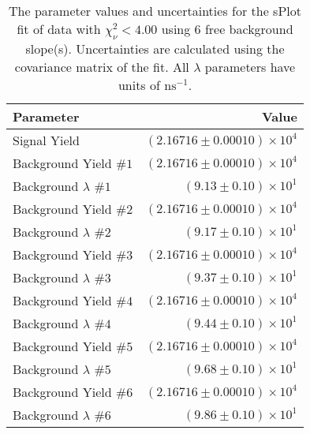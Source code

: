 
\begin{table}
    \begin{center}
        \begin{tabular}{lr}\toprule
            Parameter & Value \\\midrule
            Signal Yield & $(2.16716 \pm 0.00010) \times 10^{4}$ \\
            Background Yield $\#1$ & $(2.16716 \pm 0.00010) \times 10^{4}$ \\
            Background $\lambda$ $\#1$ & $(9.13 \pm 0.10) \times 10^{1}$ \\
            Background Yield $\#2$ & $(2.16716 \pm 0.00010) \times 10^{4}$ \\
            Background $\lambda$ $\#2$ & $(9.17 \pm 0.10) \times 10^{1}$ \\
            Background Yield $\#3$ & $(2.16716 \pm 0.00010) \times 10^{4}$ \\
            Background $\lambda$ $\#3$ & $(9.37 \pm 0.10) \times 10^{1}$ \\
            Background Yield $\#4$ & $(2.16716 \pm 0.00010) \times 10^{4}$ \\
            Background $\lambda$ $\#4$ & $(9.44 \pm 0.10) \times 10^{1}$ \\
            Background Yield $\#5$ & $(2.16716 \pm 0.00010) \times 10^{4}$ \\
            Background $\lambda$ $\#5$ & $(9.68 \pm 0.10) \times 10^{1}$ \\
            Background Yield $\#6$ & $(2.16716 \pm 0.00010) \times 10^{4}$ \\
            Background $\lambda$ $\#6$ & $(9.86 \pm 0.10) \times 10^{1}$ \\\bottomrule
        \end{tabular}
        \caption{The parameter values and uncertainties for the sPlot fit of data with $\chi^2_\nu < 4.00$ using 6 free background slope(s). Uncertainties are calculated using the covariance matrix of the fit. All $\lambda$ parameters have units of $\si{\nano\second}^{-1}$.}
    \end{center}
\end{table}
